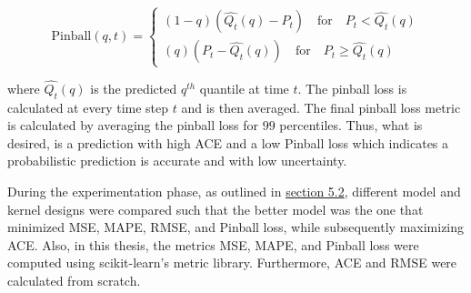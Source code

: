 \begin{itemize}
    $$ \text{Pinball}(q, t) = 
    \begin{cases}
    (1 - q)(\hat{Q_t}(q) - P_t) \quad \text{for} \quad P_t < \hat{Q_t}(q) \\
    (q)(P_t - \hat{Q_t}(q)) \quad \text{for} \quad P_t \ge \hat{Q_t}(q) 
    \end{cases}
    $$
    
    where $\hat{Q_t}(q)$ is the predicted $q^{th}$ quantile at time $t$. The pinball loss is calculated at every time step $t$ and is then averaged. The final pinball loss metric is calculated by averaging the pinball loss for $99$ percentiles. Thus, what is desired, is a prediction with high ACE and a low Pinball loss which indicates a probabilistic prediction is accurate and with low uncertainty.
    
\end{itemize}

During the experimentation phase, as outlined in \hyperlink{section.5.2}{section 5.2}, different model and kernel designs were compared such that the better model was the one that minimized MSE, MAPE, RMSE, and Pinball loss, while subsequently maximizing ACE. Also, in this thesis, the metrics MSE, MAPE, and Pinball loss were computed using scikit-learn's metric library. Furthermore, ACE and RMSE were calculated from scratch. 



